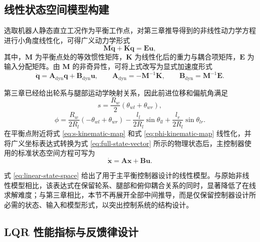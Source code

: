 \subsection{线性状态空间模型构建}

选取机器人静态直立工况作为平衡工作点，对第三章推导得到的非线性动力学方程进行小角度线性化，可得广义动力学形式
\begin{equation}
  \boldsymbol{M}\ddot{\boldsymbol{q}} + \boldsymbol{K}\boldsymbol{q} = \boldsymbol{E}\boldsymbol{u},
  \label{eq:linearized-generalized-dynamics}
\end{equation}
其中，$\boldsymbol{M}$ 为平衡点处的等效惯性矩阵，$\boldsymbol{K}$ 为线性化后的重力与耦合项矩阵，$\boldsymbol{E}$ 为输入分配矩阵。由 $\boldsymbol{M}$ 的非奇异性，可将上式改写为显式加速度形式
\begin{equation}
  \ddot{\boldsymbol{q}}
  =
  \boldsymbol{A}_{\mathrm{dyn}} \boldsymbol{q}
  +
  \boldsymbol{B}_{\mathrm{dyn}} \boldsymbol{u},
  \qquad
  \boldsymbol{A}_{\mathrm{dyn}} = -\boldsymbol{M}^{-1}\boldsymbol{K},
  \qquad
  \boldsymbol{B}_{\mathrm{dyn}} = \boldsymbol{M}^{-1}\boldsymbol{E}.
  \label{eq:qdd-dyn}
\end{equation}

第三章已经给出轮系与腿部运动学映射关系，因此前进位移和偏航角满足
\begin{equation}
  s = \frac{R_w}{2}\left(\theta_{wl} + \theta_{wr}\right),
  \label{eq:s-kinematic-map}
\end{equation}
\begin{equation}
  \phi
  =
  \frac{R_w}{2R_l}\left(-\theta_{wl} + \theta_{wr}\right)
  -
  \frac{l_l}{2R_l}\sin \theta_{ll}
  +
  \frac{l_r}{2R_l}\sin \theta_{lr}.
  \label{eq:phi-kinematic-map}
\end{equation}
在平衡点附近将式 \eqref{eq:s-kinematic-map} 和式 \eqref{eq:phi-kinematic-map} 线性化，并将广义坐标表达式转换为式 \eqref{eq:full-state-vector} 所示的物理状态后，主控制器使用的标准状态空间方程可写为
\begin{equation}
  \dot{\boldsymbol{x}} = \boldsymbol{A}\boldsymbol{x} + \boldsymbol{B}\boldsymbol{u}.
  \label{eq:linear-state-space}
\end{equation}

式 \eqref{eq:linear-state-space} 给出了用于主平衡控制器设计的线性模型。与原始非线性模型相比，该表达式在保留轮系、腿部和俯仰耦合关系的同时，显著降低了在线求解难度；与第三章相比，本节不再展开全部中间推导，而是仅保留控制器设计所必需的状态、输入和模型形式，以突出控制系统的结构设计。

\subsection{LQR 性能指标与反馈律设计}

